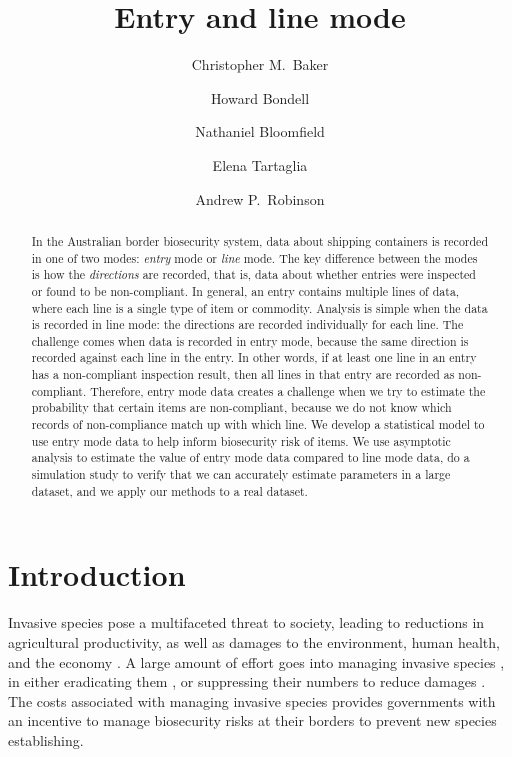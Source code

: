 \documentclass{article}
\title{Entry and line mode}
\author{Christopher M.\ Baker \and Howard Bondell \and Nathaniel Bloomfield \and Elena Tartaglia \and Andrew P.\ Robinson}
\begin{document}
  
\maketitle
\begin{abstract}
In the Australian border biosecurity system, data about shipping containers is recorded in one of two modes: \emph{entry} mode or \emph{line} mode. The key difference between the modes is how the \emph{directions} are recorded, that is, data about whether entries were inspected or found to be non-compliant. In general, an entry contains multiple lines of data, where each line is a single type of item or commodity. Analysis is simple when the data is recorded in line mode: the directions are recorded individually for each line. The challenge comes when data is recorded in entry mode, because the same direction is recorded against each line in the entry. In other words, if at least one line in an entry has a non-compliant inspection result, then all lines in that entry are recorded as non-compliant. Therefore, entry mode data creates a challenge when we try to estimate the probability that certain items are non-compliant, because we do not know which records of non-compliance match up with which line. We develop a statistical model to use entry mode data to help inform biosecurity risk of items. We use asymptotic analysis to estimate the value of entry mode data compared to line mode data, do a simulation study to verify that we can accurately estimate parameters in a large dataset, and we apply our methods to a real dataset. 
\end{abstract}

\section{Introduction}

Invasive species pose a multifaceted threat to society, leading to reductions in agricultural productivity, as well as damages to the environment, human health, and the economy \citep{kumar_rai_invasive_2020}. A large amount of effort goes into managing invasive species \citep{jardine_estimating_2018}, in either eradicating them \citep{baker_recent_2020,holmes_globally_2019, wenger_estimating_2017,helmstedt_prioritizing_2016}, or suppressing their numbers to reduce damages \citep{binny_long-term_2021,brook_effects_2012,sharov_slow_2002}. The costs associated with managing invasive species provides governments with an incentive to manage biosecurity risks at their borders to prevent new species establishing. 
\end{document}
